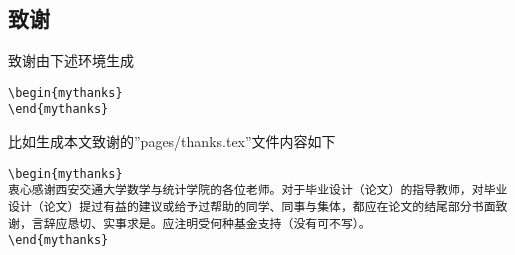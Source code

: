 \subsection{致谢}
\label{ch3_4}
致谢由下述环境生成
\begin{lstlisting}[frame=single,escapeinside='']
\begin{mythanks}
\end{mythanks}
\end{lstlisting}
比如生成本文致谢的''pages/thanks.tex''文件内容如下
\begin{lstlisting}[frame=single,escapeinside='']
\begin{mythanks}
衷心感谢西安交通大学数学与统计学院的各位老师。对于毕业设计（论文）的指导教师，对毕业设计（论文）提过有益的建议或给予过帮助的同学、同事与集体，都应在论文的结尾部分书面致谢，言辞应恳切、实事求是。应注明受何种基金支持（没有可不写）。
\end{mythanks}
\end{lstlisting}
